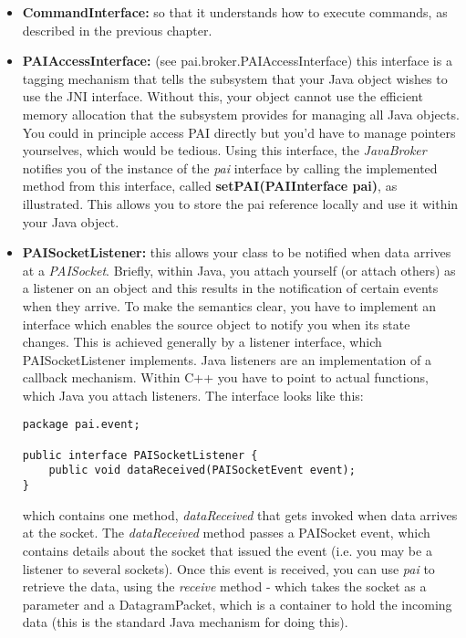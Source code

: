 \begin{itemize}
\item \textbf{CommandInterface:} so that it understands how to execute
commands, as described in the previous chapter. 
\item \textbf{PAIAccessInterface:} (see pai.broker.PAIAccessInterface) 
this interface is a tagging mechanism that tells the subsystem 
that your Java object wishes to use the JNI
interface.  Without this, your object cannot use the efficient memory
allocation that the subsystem provides for managing all Java objects.
You could in principle access PAI directly but you'd have to manage 
pointers yourselves, which would be tedious.  Using this interface,
the \emph{JavaBroker} notifies you of the instance of the 
\emph{pai} interface by calling the implemented method from this
interface, called \textbf{setPAI(PAIInterface pai)}, as illustrated.  This
allows you to store the pai reference locally and use it within your Java
object.
\item \textbf{PAISocketListener:} this allows your class to be notified when
data arrives at a \emph{PAISocket}. Briefly, within Java, you attach yourself
(or attach others) as a listener on an object and this results in the 
notification of certain events when they arrive. To make the semantics
clear, you have to implement an interface which enables the source object to 
notify you when its state changes.  This is achieved generally by a listener
interface, which PAISocketListener implements. Java listeners are an implementation
of a callback mechanism.  Within C++ you have to point to actual functions,
which Java you attach listeners. The interface looks like this:
 
\footnotesize
\begin{verbatim}
package pai.event;

public interface PAISocketListener {
    public void dataReceived(PAISocketEvent event);
}
\end{verbatim}
\normalsize

\noindent which contains one method, \emph{dataReceived} that gets
invoked when data arrives at the socket. The \emph{dataReceived} method
passes a PAISocket event, which contains details about the socket that
issued the event (i.e. you may be a listener to several sockets). Once this
event is received, you can use \emph{pai} to retrieve the data, using the
\emph{receive} method - which takes the socket as a parameter and
a DatagramPacket, which is a container to hold the incoming data (this
is the standard Java mechanism for doing this).
\end{itemize}

